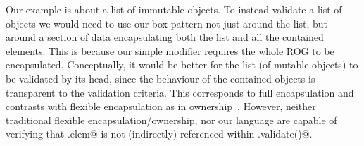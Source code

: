 Our example is about a list of immutable objects.
To instead validate a list of \Q@mut@ objects we would need to use our box pattern not just around the list,
but around a section of data encapsulating both the list and all the contained elements.
This is because our simple \Q@capsule@ modifier requires the whole ROG to be encapsulated.
Conceptually, it would be better for the list (of mutable objects) to be validated by its
head, since the behaviour of the contained objects is transparent to the validation criteria. 
This corresponds to full encapsulation and contrasts with flexible encapsulation as in 
ownership~\cite{ClarkeEtAl98}. However, neither traditional flexible encapsulation/ownership, nor our language are capable of verifying that \Q@List.elem@ is not (indirectly) referenced within \Q@ListBox.validate()@.

